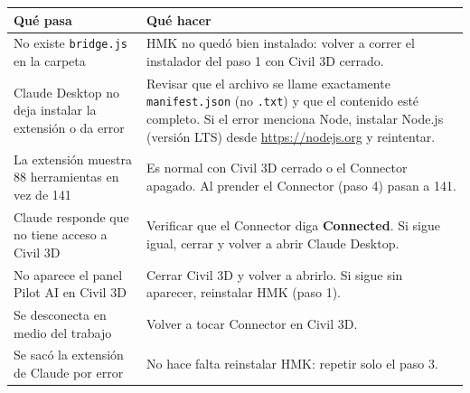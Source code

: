 \documentclass[12pt, a4paper]{article}
\begin{document}
{\renewcommand{\arraystretch}{1.4}
\setlength{\aboverulesep}{0pt}
\setlength{\belowrulesep}{0pt}
\begin{xltabular}{\textwidth}{>{\raggedright\arraybackslash}p{5cm} >{\raggedright\arraybackslash}X}
\toprule
{}
\textbf{Qué pasa} & \textbf{Qué hacer} \\
\hline
\endhead
No existe \texttt{bridge.js} en la carpeta & HMK no quedó bien instalado: volver a correr el
instalador del paso 1 con Civil 3D cerrado. \\
\hline
Claude Desktop no deja instalar la extensión o da error & Revisar que el archivo se llame
exactamente \texttt{manifest.json} (no \texttt{.txt}) y que el contenido esté completo. Si el
error menciona Node, instalar Node.js (versión LTS) desde \url{https://nodejs.org} y reintentar.
\\
\hline
La extensión muestra 88 herramientas en vez de 141 & Es normal con Civil 3D cerrado o el
Connector apagado. Al prender el Connector (paso 4) pasan a 141. \\
\hline
Claude responde que no tiene acceso a Civil 3D & Verificar que el Connector diga
\textbf{Connected}. Si sigue igual, cerrar y volver a abrir Claude Desktop. \\
\hline
No aparece el panel Pilot AI en Civil 3D & Cerrar Civil 3D y volver a abrirlo. Si sigue sin
aparecer, reinstalar HMK (paso 1). \\
\hline
Se desconecta en medio del trabajo & Volver a tocar Connector en Civil 3D. \\
\hline
Se sacó la extensión de Claude por error & No hace falta reinstalar HMK: repetir solo el
paso 3. \\
\bottomrule
\end{xltabular}}
\end{document}
